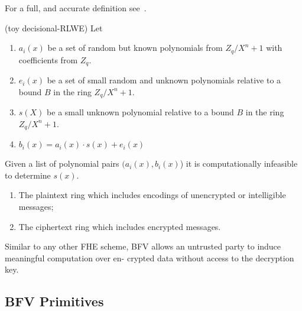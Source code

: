 For a full, and accurate definition see~\cite[def 3.3]{RLWE}.
\begin{defn} (toy decisional-RLWE)
    Let 
    \begin{enumerate}
        \item $a_i(x)$ be a set of random but known polynomials from $Z_q/X^n+1$ with 
        coefficients from $Z_q$.
        \item  $e_i(x)$ be a set of small random and unknown polynomials 
        relative to a bound $B$ in the ring $Z_q/X^n+1$.
        \item $s(X)$ be a small unknown polynomial 
        relative to a bound $B$ in the ring $Z_q/X^n+1$.
        \item $b_i(x)=a_i(x)\cdot s(x) + e_i(x)$
    \end{enumerate}
    
    Given a list of polynomial pairs $(a_i(x),b_i(x)$) it is computationally infeasible 
    to determine $s(x)$.
\end{defn}

\begin{enumerate}
\item The plaintext ring which includes encodings of unencrypted or intelligible
messages;
\item The ciphertext ring which includes encrypted messages.
\end{enumerate}
Similar to any other FHE scheme, BFV allows an untrusted party to
induce meaningful computation over en- crypted data without access
to the decryption key.

\subsection{BFV Primitives}


